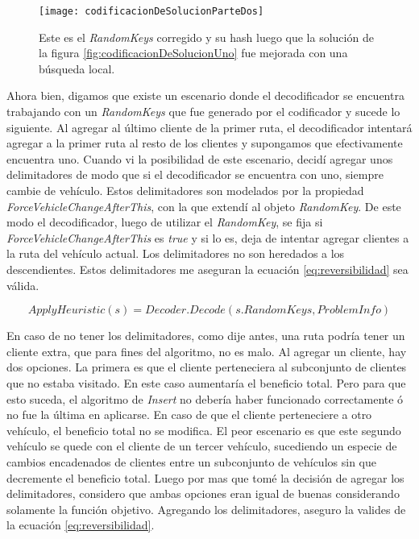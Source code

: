 \begin{figure}[h]
    \caption{Este es el \textit{RandomKeys} corregido y su hash luego que la solución de la figura \ref{fig:codificacionDeSolucionUno} fue mejorada con una búsqueda local.}
    \centering
    \texttt{[image: codificacionDeSolucionParteDos]}
    \label{fig:codificacionDeSolucionParteDos}
\end{figure} 


\bigskip

Ahora bien, digamos que existe un escenario donde el decodificador se encuentra trabajando con un \textit{RandomKeys} que fue generado por el codificador y sucede lo siguiente. Al agregar al último cliente de la primer ruta, el decodificador intentará agregar a la primer ruta al resto de los clientes y supongamos que efectivamente encuentra uno. Cuando vi la posibilidad de este escenario, decidí agregar unos delimitadores de modo que si el decodificador se encuentra con uno, siempre cambie de vehículo. Estos delimitadores son modelados por la propiedad \textit{ForceVehicleChangeAfterThis}, con la que extendí al objeto \textit{RandomKey}. De este modo el decodificador, luego de utilizar el \textit{RandomKey}, se fija si \textit{ForceVehicleChangeAfterThis} es \textit{true} y si lo es, deja de intentar agregar clientes a la ruta del vehículo actual. Los delimitadores no son heredados a los descendientes. Estos delimitadores me aseguran la ecuación \ref{eq:reversibilidad} sea válida.

\begin{equation} \label{eq:reversibilidad}
ApplyHeuristic(s) = Decoder.Decode(s.RandomKeys, ProblemInfo)
\end{equation}

\bigskip

En caso de no tener los delimitadores, como dije antes, una ruta podría tener un cliente extra, que para fines del algoritmo, no es malo. Al agregar un cliente, hay dos opciones. La primera es que el cliente perteneciera al subconjunto de clientes que no estaba visitado. En este caso aumentaría el beneficio total. Pero para que esto suceda, el algoritmo de \textit{Insert} no debería haber funcionado correctamente ó no fue la última en aplicarse. En caso de que el cliente perteneciere a otro vehículo, el beneficio total no se modifica. El peor escenario es que este segundo vehículo se quede con el cliente de un tercer vehículo, sucediendo un especie de cambios encadenados de clientes entre un subconjunto de vehículos sin que decremente el beneficio total. Luego por mas que tomé la decisión de agregar los delimitadores, considero que ambas opciones eran igual de buenas considerando solamente la función objetivo. Agregando los delimitadores, aseguro la valides de la ecuación \ref{eq:reversibilidad}.

